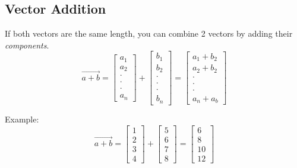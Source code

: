 \documentclass[12pt]{report}
\begin{document}
        \subsection{Vector Addition}
            If both vectors are the same length, you can combine 2 vectors by adding their \emph{components}.
            \begin{equation}
                \vec{a + b} =
                    \begin{bmatrix} a_1 \\ a_2 \\ \cdot \\ \cdot \\ \cdot \\ a_n \end{bmatrix} +
                    \begin{bmatrix} b_1 \\ b_2 \\ \cdot \\ \cdot \\ \cdot \\ b_n \end{bmatrix} =
                    \begin{bmatrix} a_1 + b_2 \\ a_2 + b_2 \\ \cdot \\ \cdot \\ \cdot \\ a_n + a_b \end{bmatrix}
            \end{equation}

            Example:
            \begin{equation}
                \vec{a + b} =
                    \begin{bmatrix} 1 \\ 2 \\ 3 \\ 4 \end{bmatrix} +
                    \begin{bmatrix} 5 \\ 6 \\ 7 \\ 8 \end{bmatrix} =
                    \begin{bmatrix} 6 \\ 8 \\ 10 \\ 12 \end{bmatrix}
            \end{equation}
\end{document}
